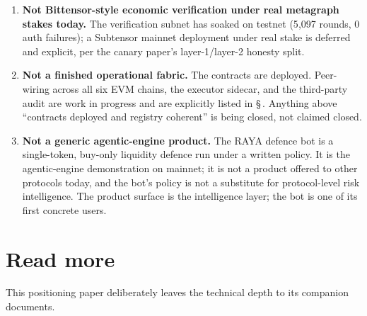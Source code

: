 \documentclass[11pt,a4paper]{article}
\begin{document}
\begin{enumerate}
  \item \textbf{Not Bittensor-style economic verification under real
    metagraph stakes today.} The verification subnet has soaked on
    testnet (5{,}097 rounds, 0 auth failures); a Subtensor mainnet
    deployment under real stake is deferred and explicit, per the
    canary paper's layer-1/layer-2 honesty split.
  \item \textbf{Not a finished operational fabric.} The contracts
    are deployed. Peer-wiring across all six EVM chains, the executor
    sidecar, and the third-party audit are work in progress and are
    explicitly listed in \S\,. Anything above ``contracts
    deployed and registry coherent'' is being closed, not claimed
    closed.
  \item \textbf{Not a generic agentic-engine product.} The RAYA
    defence bot is a single-token, buy-only liquidity defence run
    under a written policy. It is the agentic-engine demonstration on
    mainnet; it is not a product offered to other protocols today,
    and the bot's policy is not a substitute for protocol-level risk
    intelligence. The product surface is the intelligence layer; the
    bot is one of its first concrete users.
\end{enumerate}

\section*{Read more}
\label{sec:read-more}

This positioning paper deliberately leaves the technical depth to its
companion documents.
\end{document}
